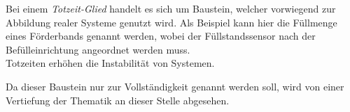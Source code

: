 Bei einem \textit{Totzeit-Glied} handelt es sich um Baustein, welcher vorwiegend zur Abbildung realer Systeme genutzt wird. Als Beispiel kann hier die Füllmenge eines Förderbands genannt werden, wobei der Füllstandssensor nach der Befülleinrichtung angeordnet werden muss.\\
Totzeiten erhöhen die Instabilität von Systemen. \missing[Quelle??]

Da dieser Baustein nur zur Vollständigkeit genannt werden soll, wird von einer Vertiefung der Thematik an dieser Stelle abgesehen.



















